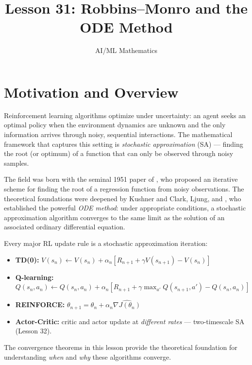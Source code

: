 \documentclass[11pt,a4paper]{article}
\title{Lesson 31: Robbins--Monro and the ODE Method}
\author{AI/ML Mathematics}
\date{}
\begin{document}
\maketitle
\tableofcontents
\newpage


\section{Motivation and Overview}
\label{sec:motivation}

Reinforcement learning algorithms optimize under uncertainty: an agent
seeks an optimal policy when the environment dynamics are unknown and the
only information arrives through noisy, sequential interactions. The
mathematical framework that captures this setting is \emph{stochastic
approximation} (SA) --- finding the root (or optimum) of a function
that can only be observed through noisy samples.

The field was born with the seminal 1951 paper of \citet{robbins1951},
who proposed an iterative scheme for finding the root of a regression
function from noisy observations. The theoretical foundations were
deepened by Kushner and Clark, Ljung, and \citet{borkar2008}, who
established the powerful \emph{ODE method}: under appropriate conditions,
a stochastic approximation algorithm converges to the same limit as the
solution of an associated ordinary differential equation.

\begin{rlconnection}[title={SA as the Engine of RL}]
Every major RL update rule is a stochastic approximation iteration:
\begin{itemize}[nosep]
  \item \textbf{TD(0):}
    $V(s_n) \leftarrow V(s_n) + \alpha_n[R_{n+1} + \gamma V(s_{n+1}) - V(s_n)]$
  \item \textbf{Q-learning:}
    $Q(s_n,a_n) \leftarrow Q(s_n,a_n) + \alpha_n[R_{n+1} + \gamma \max_{a'} Q(s_{n+1},a') - Q(s_n,a_n)]$
  \item \textbf{REINFORCE:}
    $\theta_{n+1} = \theta_n + \alpha_n \widehat{\nabla J(\theta_n)}$
  \item \textbf{Actor-Critic:} critic and actor update at
    \emph{different rates} --- two-timescale SA (Lesson 32).
\end{itemize}
The convergence theorems in this lesson provide the theoretical
foundation for understanding \emph{when} and \emph{why} these
algorithms converge.
\end{rlconnection}
\end{document}
